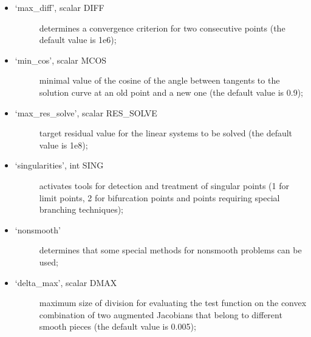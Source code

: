 \documentclass[a4paper,11pt,english]{sphinxmanual}
\begin{document}
\begin{fulllineitems}
\begin{itemize}
\begin{itemize}
\begin{description}
\end{description}

\item {} \begin{description}
\item[{‘max\_diff’, scalar DIFF}] \leavevmode
determines a convergence criterion for two consecutive points (the
default value is 1e\sphinxhyphen{}6);

\end{description}

\item {} \begin{description}
\item[{‘min\_cos’, scalar MCOS}] \leavevmode
minimal value of the cosine of the angle between tangents to the
solution curve at an old point and a new one (the default value is
0.9);

\end{description}

\item {} \begin{description}
\item[{‘max\_res\_solve’, scalar RES\_SOLVE}] \leavevmode
target residual value for the linear systems to be solved (the
default value is 1e\sphinxhyphen{}8);

\end{description}

\item {} \begin{description}
\item[{‘singularities’, int SING}] \leavevmode
activates tools for detection and treatment of singular points (1 for
limit points, 2 for bifurcation points and points requiring special
branching techniques);

\end{description}

\item {} \begin{description}
\item[{‘non\sphinxhyphen{}smooth’}] \leavevmode
determines that some special methods for non\sphinxhyphen{}smooth problems can be
used;

\end{description}

\item {} \begin{description}
\item[{‘delta\_max’, scalar DMAX}] \leavevmode
maximum size of division for evaluating the test function on the
convex combination of two augmented Jacobians that belong to different
smooth pieces (the default value is 0.005);


\end{description}
\end{itemize}
\end{itemize}
\end{fulllineitems}
\end{document}
